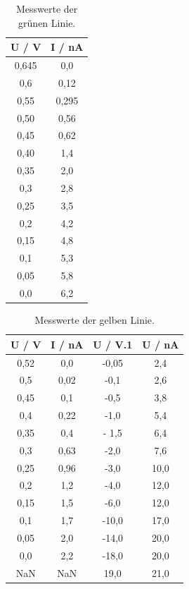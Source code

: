 \begin{table}
  \centering
  \caption{Messwerte der grünen Linie.}
  \label{tab:spek3}
  \begin{tabular}{c c}
    \toprule
    U / V & I / nA \\
    \midrule
    0,645 &    0,0 \\
      0,6 &   0,12 \\
     0,55 &  0,295 \\
     0,50 &   0,56 \\
     0,45 &   0,62 \\
     0,40 &    1,4 \\
     0,35 &    2,0 \\
      0,3 &    2,8 \\
     0,25 &    3,5 \\
      0,2 &    4,2 \\
     0,15 &    4,8 \\
      0,1 &    5,3 \\
     0,05 &    5,8 \\
      0,0 &    6,2 \\
    \bottomrule
    \end{tabular}
\end{table}

\begin{table}
  \centering
  \caption{Messwerte der gelben Linie.}
  \label{tab:spek4}
  \begin{tabular}{c c c c}
    \toprule
    U / V & I / nA & U / V.1 & U / nA \\
    \midrule
     0,52 &    0,0 &   -0,05 &    2,4 \\
      0,5 &   0,02 &    -0,1 &    2,6 \\
     0,45 &    0,1 &    -0,5 &    3,8 \\
      0,4 &   0,22 &    -1,0 &    5,4 \\
     0,35 &    0,4 &   - 1,5 &    6,4 \\
      0,3 &   0,63 &    -2,0 &    7,6 \\
     0,25 &   0,96 &    -3,0 &   10,0 \\
      0,2 &    1,2 &    -4,0 &   12,0 \\
     0,15 &    1,5 &    -6,0 &   12,0 \\
      0,1 &    1,7 &   -10,0 &   17,0 \\
     0,05 &    2,0 &   -14,0 &   20,0 \\
      0,0 &    2,2 &   -18,0 &   20,0 \\
      NaN &    NaN &    19,0 &   21,0 \\
    \bottomrule
  \end{tabular}
\end{table}


